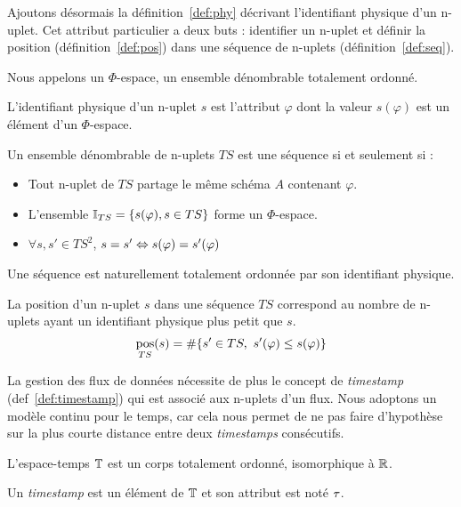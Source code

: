 Ajoutons désormais la définition~\ref{def:phy} décrivant l'identifiant physique d'un n-uplet. Cet attribut particulier a deux buts : identifier un n-uplet et définir la position (définition~\ref{def:pos}) dans une séquence de n-uplets (définition~\ref{def:seq}).
\begin{defi}\label{def:phy}
    Nous appelons un $\Phi$-espace, un ensemble dénombrable totalement ordonné.

    L'identifiant physique d'un n-uplet $s$ est l'attribut $\varphi$ dont la valeur $s(\varphi)$ est un élément d'un $\Phi$-espace.
\end{defi}
\begin{defi}\label{def:seq}
    Un ensemble dénombrable de n-uplets $TS$ est une séquence si et seulement si : 
    \begin{itemize}
     \item Tout n-uplet de $TS$ partage le même schéma $A$ contenant $\varphi$.
     \item L'ensemble $\mathbb{I}_{TS}=\{s(\varphi), s\in TS\}$ forme un $\Phi$-espace.
     \item $\forall s,s' \in TS^2$, $s = s' \Leftrightarrow s(\varphi) = s'(\varphi)$
    \end{itemize}

    Une séquence est naturellement totalement ordonnée par son identifiant physique.
\end{defi}
\begin{defi}\label{def:pos}
    La position d'un n-uplet $s$ dans une séquence $TS$ correspond au nombre de n-uplets ayant un identifiant physique plus petit que $s$.
    $$\mathop{\mathrm{pos}}_{TS}(s) = \#\{s'\in TS,\ s'(\varphi) \leq s(\varphi) \}$$
\end{defi}

La gestion des flux de données nécessite de plus le concept de \textit{timestamp} (def~\ref{def:timestamp}) qui est associé aux n-uplets d'un flux. Nous adoptons un modèle continu pour le temps, car cela nous permet de ne pas faire d'hypothèse sur la plus courte distance entre deux \textit{timestamps} consécutifs.
\begin{defi}[Timestamp]\label{def:timestamp}
    L'espace-temps $\mathbb{T}$ est un corps totalement ordonné, isomorphique à $\mathbb{R}$. 

    Un \textit{timestamp} est un élément de $\mathbb{T}$ et son attribut est noté $\tau$.
\end{defi}

